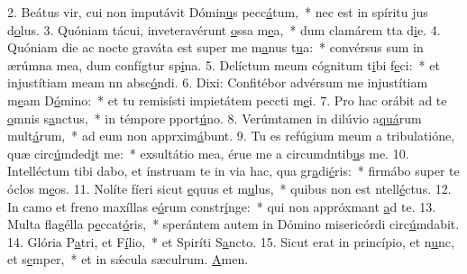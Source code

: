 2. Beátus vir, cui non imputávit Dómin\uline{u}s pecc\uline{á}tum,~* nec est in spíritu jus d\uline{o}lus.
3. Quóniam tácui, inveteravérunt \uline{o}ssa m\uline{e}a,~* dum clamárem tta d\uline{i}e.
4. Quóniam die ac nocte graváta est super me m\uline{a}nus t\uline{u}a:~* convérsus sum in ærúmna mea, dum confígtur sp\uline{i}na.
5. Delíctum meum cógnitum t\uline{i}bi f\uline{e}ci:~* et injustítiam meam nn absc\uline{ó}ndi.
6. Dixi: Confitébor advérsum me injustítiam m\uline{e}am D\uline{ó}mino:~* et tu remisísti impietátem peccti m\uline{e}i.
7. Pro hac orábit ad te \uline{o}mnis s\uline{a}nctus,~* in témpore pport\uline{ú}no.
8. Verúmtamen in dilúvio a\uline{quá}rum mult\uline{á}rum,~* ad eum non apprxim\uline{á}bunt.
9. Tu es refúgium meum a tribulatióne, quæ circ\uline{ú}mded\uline{i}t me:~* exsultátio mea, érue me a circumdntib\uline{u}s me.
10. Intelléctum tibi dabo, et ínstruam te in via hac, qua gr\uline{a}di\uline{é}ris:~* firmábo super te óclos m\uline{e}os.
11. Nolíte fíeri sicut \uline{e}quus et m\uline{u}lus,~* quibus non est ntell\uline{é}ctus.
12. In camo et freno maxíllas e\uline{ó}rum constr\uline{í}nge:~* qui non appróxmant \uline{a}d te.
13. Multa flagélla p\uline{e}ccat\uline{ó}ris,~* sperántem autem in Dómino misericórdi circ\uline{ú}mdabit.
14. Glória P\uline{a}tri, et F\uline{í}lio,~* et Spiríti S\uline{a}ncto.
15. Sicut erat in princípio, et n\uline{u}nc, et s\uline{e}mper,~* et in sǽcula sæculrum. \uline{A}men.
